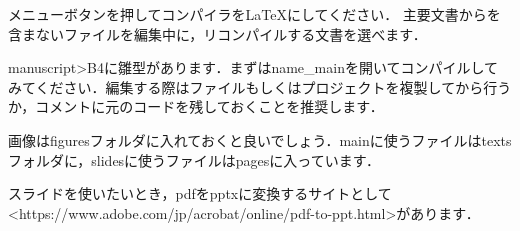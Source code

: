 メニューボタンを押してコンパイラをLaTeXにしてください．
主要文書からを含まないファイルを編集中に，リコンパイルする文書を選べます．

manuscript>B4に雛型があります．まずはname_mainを開いてコンパイルしてみてください．編集する際はファイルもしくはプロジェクトを複製してから行うか，コメントに元のコードを残しておくことを推奨します．

画像はfiguresフォルダに入れておくと良いでしょう．mainに使うファイルはtextsフォルダに，slidesに使うファイルはpagesに入っています．

スライドを使いたいとき，pdfをpptxに変換するサイトとして<https://www.adobe.com/jp/acrobat/online/pdf-to-ppt.html>があります．